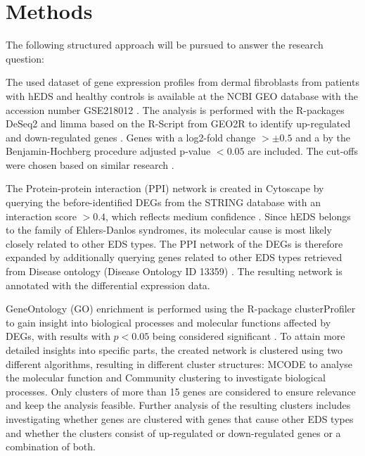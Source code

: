 \section{Methods}
The following structured approach will be pursued to answer the research question:

\begin{description}[leftmargin=5pt]
	\item [Analysis of Differentially Expressed Genes (DEGs).]\label{sec:methods-deg}The used dataset of gene expression profiles from dermal fibroblasts from patients with hEDS and healthy controls is available at the NCBI GEO database with the accession number GSE218012 \cite{Ritelli2020}. The analysis is performed with the R-packages DeSeq2 and limma based on the R-Script from GEO2R to identify up-regulated and down-regulated genes \cite{DESeq2, limma}. Genes with a log2-fold change $> \pm 0.5$ and a by the Benjamin-Hochberg procedure adjusted p-value $< 0.05$ are included. The cut-offs were chosen based on similar research \cite{Karimizadeh2019, Lim2019}.

	\item[Network Creation.] The Protein-protein interaction (PPI) network is created in Cytoscape \cite{Cytoscape} by querying the before-identified DEGs from the STRING database with an interaction score $> 0.4$, which reflects medium confidence \cite{StringDB}. Since hEDS belongs to the family of Ehlers-Danlos syndromes, its molecular cause is most likely closely related to other EDS types. The PPI network of the DEGs is therefore expanded by additionally querying genes related to other EDS types retrieved from Disease ontology (Disease Ontology ID 13359) \cite{DO}. The resulting network is annotated with the differential expression data.
	
	\item[Gene Ontology and Clustering.]GeneOntology (GO) enrichment is performed using the R-package clusterProfiler to gain insight into biological processes and molecular functions affected by DEGs, with results with $p < 0.05$ being considered significant \cite{Ashburner2000,Consortium2023, Wu2021}. To attain more detailed insights into specific parts, the created network is clustered using two different algorithms, resulting in different cluster structures: MCODE to analyse the molecular function and Community clustering to investigate biological processes. Only clusters of more than 15 genes are considered to ensure relevance and keep the analysis feasible. Further analysis of the resulting clusters includes investigating whether genes are clustered with genes that cause other EDS types and whether the clusters consist of up-regulated or down-regulated genes or a combination of both.
	

\end{description}
